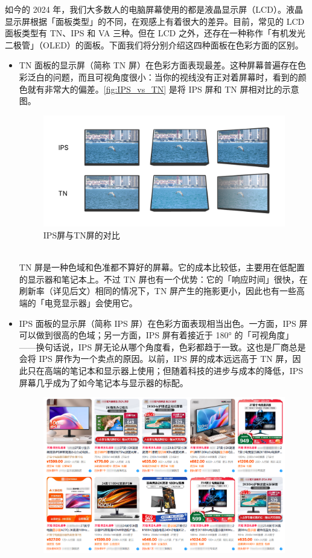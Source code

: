 如今的 2024 年，我们大多数人的电脑屏幕使用的都是液晶显示屏（LCD）。液晶显示屏根据「面板类型」的不同，在观感上有着很大的差异。目前，常见的 LCD 面板类型有 TN、IPS 和 VA 三种。但在 LCD 之外，还存在一种称作「有机发光二极管」（OLED）的面板。下面我们将分别介绍这四种面板在色彩方面的区别。

\begin{itemize}
  \item TN 面板的显示屏（简称 TN 屏）在色彩方面表现最差。这种屏幕普遍存在色彩泛白的问题，而且可视角度很小：当你的视线没有正对着屏幕时，看到的颜色就有非常大的偏差。\autoref{fig:IPS_vs_TN} 是将 IPS 屏和 TN 屏相对比的示意图。
    \begin{figure}[htb!]
      \centering
      \includegraphics[width=.9\textwidth]{assets/advanced/IPS_vs_TN.pdf}
      \caption{IPS屏与TN屏的对比}
      \label{fig:IPS_vs_TN}
    \end{figure}\\
    TN 屏是一种色域和色准都不算好的屏幕。它的成本比较低，主要用在低配置的显示器和笔记本上。不过 TN 屏也有一个优势：它的「响应时间」很快，在刷新率（详见后文）相同的情况下，TN 屏产生的拖影更小，因此也有一些高端的「电竞显示器」会使用它。
  \item IPS 面板的显示屏（简称 IPS 屏）在色彩方面表现相当出色。一方面，IPS 屏可以做到很高的色域；另一方面，IPS 屏有着接近于 180° 的「可视角度」——换句话说，IPS 屏无论从哪个角度看，色彩都趋于一致。这也是厂商总是会将 IPS 屏作为一个卖点的原因。以前，IPS 屏的成本远远高于 TN 屏，因此只在高端的笔记本和显示器上使用；但随着科技的进步与成本的降低，IPS 屏幕几乎成为了如今笔记本与显示器的标配。
    \begin{figure}[htb!]
      \centering
      \includegraphics[width=.8\textwidth]{assets/advanced/IPS_screens.png}

\end{figure}
\end{itemize}
